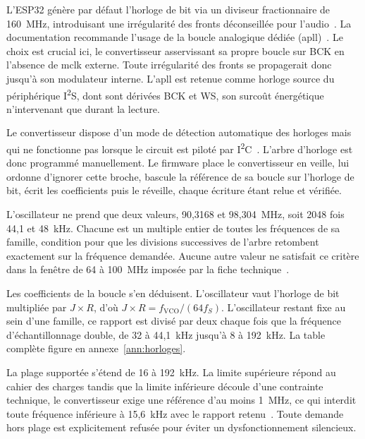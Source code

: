 L'ESP32 génère par défaut l'horloge de bit via un diviseur fractionnaire de 160~MHz, introduisant une irrégularité des fronts déconseillée pour l'audio~\cite{ESP32_IDF_i2s}. La documentation recommande l'usage de la boucle analogique dédiée (\gls{apll})~\cite{ESP32_Technical_Reference_Manual}. Le choix est crucial ici, le convertisseur asservissant sa propre boucle sur BCK en l'absence de \gls{mclk} externe. Toute irrégularité des fronts se propagerait donc jusqu'à son modulateur interne. L'\gls{apll} est retenue comme horloge source du périphérique I\textsuperscript{2}S, dont sont dérivées BCK et WS, son surcoût énergétique n'intervenant que durant la lecture.


Le convertisseur dispose d'un mode de détection automatique des horloges mais qui ne fonctionne pas lorsque le circuit est piloté par I\textsuperscript{2}C~\cite{TI_PCM5242}. L'arbre d'horloge est donc programmé manuellement. Le firmware place le convertisseur en veille, lui ordonne d'ignorer cette broche, bascule la référence de sa boucle sur l'horloge de bit, écrit les coefficients puis le réveille, chaque écriture étant relue et vérifiée.


L'oscillateur ne prend que deux valeurs, 90,3168 et 98,304~MHz, soit 2048 fois 44,1 et 48~kHz. Chacune est un multiple entier de toutes les fréquences de sa famille, condition pour que les divisions successives de l'arbre retombent exactement sur la fréquence demandée. Aucune autre valeur ne satisfait ce critère dans la fenêtre de 64 à 100~MHz imposée par la fiche technique~\cite{TI_PCM5242}.

Les coefficients de la boucle s'en déduisent. L'oscillateur vaut l'horloge de bit multipliée par $J \times R$, d'où $J \times R = f_{\text{VCO}} / (64 f_S)$. L'oscillateur restant fixe au sein d'une famille, ce rapport est divisé par deux chaque fois que la fréquence d'échantillonnage double, de 32 à 44,1~kHz jusqu'à 8 à 192~kHz. La table complète figure en annexe~\ref{ann:horloges}.

La plage supportée s'étend de 16 à 192~kHz. La limite supérieure répond au cahier des charges tandis que la limite inférieure découle d'une contrainte technique, le convertisseur exige une référence d'au moins 1~MHz, ce qui interdit toute fréquence inférieure à 15,6~kHz avec le rapport retenu~\cite{TI_PCM5242}. Toute demande hors plage est explicitement refusée pour éviter un dysfonctionnement silencieux.

